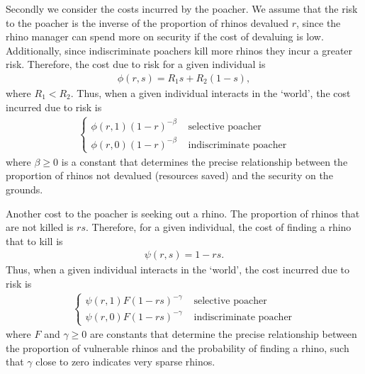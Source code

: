 \documentclass[10pt]{article}
\begin{document}
Secondly we consider the costs incurred by the poacher. We assume that the risk to the poacher is the inverse of the proportion of rhinos devalued $r$, since the rhino manager can spend more on security if the cost of devaluing is low. Additionally, since indiscriminate poachers kill more rhinos they incur a greater risk. Therefore, the cost due to risk for a given individual is
\begin{eqnarray}
\label{eqn:phi}
\phi(r,s) = R_1 s + R_2 (1-s),
\end{eqnarray}
where $R_1 < R_2$. Thus, when a given individual interacts in the `world', the cost incurred due to risk is
\begin{eqnarray}
\label{eqn:loss_risk}
\left\{
\begin{array}{cl}
\phi(r,1) (1-r)^{-\beta} & \mbox{ selective poacher}
\\
\phi(r,0) (1-r)^{-\beta} & \mbox{ indiscriminate poacher}
\end{array} \right.
\end{eqnarray}
where $\beta \geq 0$ is a constant that determines the precise relationship between the proportion of rhinos not devalued (resources saved) and the security on the grounds.

Another cost to the poacher is seeking out a rhino. The proportion of rhinos that are not killed is $rs$. Therefore, for a given individual, the cost of finding a rhino that to kill is 
\begin{eqnarray}
\label{eqn:psi}
\psi(r,s) = 1-rs.
\end{eqnarray} 
Thus, when a given individual interacts in the `world', the cost incurred due to risk is
\begin{eqnarray}
\label{eqn:loss_finding}
\left\{
\begin{array}{cl}
\psi(r,1) F(1-rs)^{-\gamma} & \mbox{ selective poacher}
\\
\psi(r,0) F(1-rs)^{-\gamma} & \mbox{ indiscriminate poacher}
\end{array} \right.
\end{eqnarray}
where $F$ and $\gamma \geq 0$ are constants that determine the precise relationship between the proportion of vulnerable rhinos and the probability of finding a rhino, such that $\gamma$ close to zero indicates very sparse rhinos. 
\end{document}
